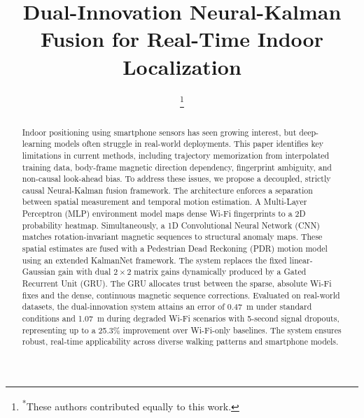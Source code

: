 \documentclass[conference]{IEEEtran}
\begin{document}
\title{Dual-Innovation Neural-Kalman Fusion for Real-Time Indoor Localization}

\author{
\thanks{\textsuperscript{*}These authors contributed equally to this work.}
}

\maketitle

\begin{abstract}
Indoor positioning using smartphone sensors has seen growing interest, but deep-learning models often struggle in real-world deployments. This paper identifies key limitations in current methods, including trajectory memorization from interpolated training data, body-frame magnetic direction dependency, fingerprint ambiguity, and non-causal look-ahead bias. To address these issues, we propose a decoupled, strictly causal Neural-Kalman fusion framework. The architecture enforces a separation between spatial measurement and temporal motion estimation. A Multi-Layer Perceptron (MLP) environment model maps dense Wi-Fi fingerprints to a 2D probability heatmap. Simultaneously, a 1D Convolutional Neural Network (CNN) matches rotation-invariant magnetic sequences to structural anomaly maps. These spatial estimates are fused with a Pedestrian Dead Reckoning (PDR) motion model using an extended KalmanNet framework. The system replaces the fixed linear-Gaussian gain with dual $2\times2$ matrix gains dynamically produced by a Gated Recurrent Unit (GRU). The GRU allocates trust between the sparse, absolute Wi-Fi fixes and the dense, continuous magnetic sequence corrections. Evaluated on real-world datasets, the dual-innovation system attains an error of 0.47~m under standard conditions and 1.07~m during degraded Wi-Fi scenarios with 5-second signal dropouts, representing up to a 25.3\% improvement over Wi-Fi-only baselines. The system ensures robust, real-time applicability across diverse walking patterns and smartphone models.
\end{abstract}
\end{document}
